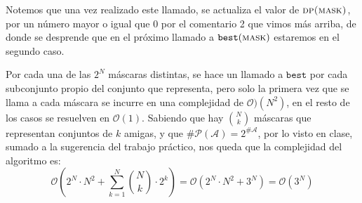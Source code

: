 	Notemos que una vez realizado este llamado, se actualiza el valor de $\textsc{dp(mask)}$, por un número mayor o igual que $0$ por el comentario 2 que vimos más arriba, de donde se desprende que en el próximo llamado a $\texttt{best}(\textsc{mask})$ estaremos en el segundo caso.	
	
	Por cada una de las $2^N$ máscaras distintas, se hace un llamado a $\texttt{best}$ por cada subconjunto propio del conjunto que representa, pero solo la primera vez que se llama a cada máscara se incurre en una complejidad de $\mathcal{O})(N^2)$, en el resto de los casos se resuelven en $\mathcal{O}(1)$. Sabiendo que hay $\binom{N}{k}$ máscaras que representan conjuntos de $k$ amigas, y que $\# \mathcal{P}(\mathcal{A}) = 2^{\# \mathcal{A}}$, por lo visto en clase, sumado a la sugerencia del trabajo práctico, nos queda que la complejidad del algoritmo es:
	$$ \mathcal{O} \left ( 2^N \cdot N^2 + \sum_{k = 1}^N \binom{N}{k} \cdot 2^k \right ) = \mathcal{O}\left (2^N \cdot N^2 + 3^N \right ) = \boxed{ \mathcal{O}(3^N)} $$
